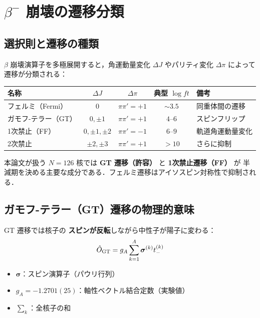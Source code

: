 \documentclass[12pt,a4paper]{ltjsarticle}
\begin{document}
\section{$\beta^-$ 崩壊の遷移分類}

\subsection{選択則と遷移の種類}

$\beta$ 崩壊演算子を多極展開すると，角運動量変化 $\Delta J$ やパリティ変化 $\Delta\pi$ によって遷移が分類される：

\begin{center}
\begin{tabular}{lcccl}
\toprule
名称 & $\Delta J$ & $\Delta\pi$ & 典型 $\log ft$ & 備考 \\
\midrule
フェルミ（Fermi） & $0$ & $\pi\pi'=+1$ & $\sim 3.5$ & 同重体間の遷移 \\
ガモフ-テラー（GT） & $0, \pm 1$ & $\pi\pi'=+1$ & $4$--$6$ & スピンフリップ \\
1次禁止（FF） & $0, \pm 1, \pm 2$ & $\pi\pi'=-1$ & $6$--$9$ & 軌道角運動量変化 \\
2次禁止 & $\pm 2, \pm 3$ & $\pi\pi'=+1$ & $>10$ & さらに抑制 \\
\bottomrule
\end{tabular}
\end{center}

\begin{point}
本論文が扱う $N=126$ 核では \textbf{GT 遷移（許容）} と \textbf{1次禁止遷移（FF）} が
半減期を決める主要な成分である．フェルミ遷移はアイソスピン対称性で抑制される．
\end{point}

\subsection{ガモフ-テラー（GT）遷移の物理的意味}

GT 遷移では核子の \textbf{スピンが反転}しながら中性子が陽子に変わる：
\begin{equation}
  \hat{O}_{\rm GT} = g_A \sum_{k=1}^{A} \bm{\sigma}^{(k)} t_-^{(k)}
\end{equation}
\begin{itemize}
  \item $\bm{\sigma}$：スピン演算子（パウリ行列）
  \item $g_A = -1.2701(25)$：軸性ベクトル結合定数（実験値）
  \item $\sum_k$：全核子の和
\end{itemize}
\end{document}
